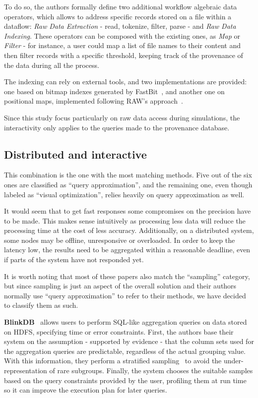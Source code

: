 To do so, the authors formally define two additional workflow 
algebraic data operators\cite{Ogasawara2011}, which allows to address 
specific records stored on a file within a dataflow: \emph{Raw Data Extraction} 
- read, tokenize, filter, parse - and \emph{Raw Data Indexing}. These 
operators can be composed with the existing ones, as \emph{Map} or 
\emph{Filter} - for instance, a user could map a list of file names to their 
content and then filter records with a specific threshold, keeping track of 
the provenance of the data during all the process.

The indexing can rely on external tools, and two implementations are provided:
one based on bitmap indexes generated by FastBit~\cite{Wu2009},
and another one on positional maps, implemented following RAW's 
approach~\cite{Karpathiotakis2014}.

Since this study focus particularly on raw data access during simulations, the 
interactivity only applies to the queries made to the provenance database. 

\subsection{Distributed and interactive}
This combination is the one with the most matching methods. Five 
out of the six ones are classified as ``query approximation'', and the 
remaining one, even though labeled as ``visual optimization'', relies heavily 
on query approximation as well.

It would seem that to get fast responses some compromises on the precision 
have to be made. This makes sense intuitively as processing less 
data will reduce the processing time at the cost of less accuracy. 
Additionally, on a distributed system, some nodes may be offline, 
unresponsive or overloaded. In order to keep the latency low, the results 
need to be aggregated within a reasonable deadline, even if parts of the system 
have not responded yet.

It is worth noting that most of these papers also match the ``sampling''
category, but since sampling is just an aspect of the overall solution and their 
authors normally use ``query approximation'' to refer to their methods, we have 
decided to classify them as such.

\medskip

\textbf{BlinkDB}~\cite{Agarwal2013} allows users to perform SQL-like aggregation 
queries on data stored on HDFS, specifying time or error constraints. First, 
the authors base their system on the assumption - supported by evidence - that 
the column sets used for the aggregation queries are predictable, regardless of 
the actual grouping value. With this information, they perform a stratified 
sampling~\cite{Lohr2009} to avoid the under-representation of rare subgroups. 
Finally, the system chooses the suitable samples based on the query constraints 
provided by the user, profiling them at run time so it can improve the 
execution plan for later queries.

